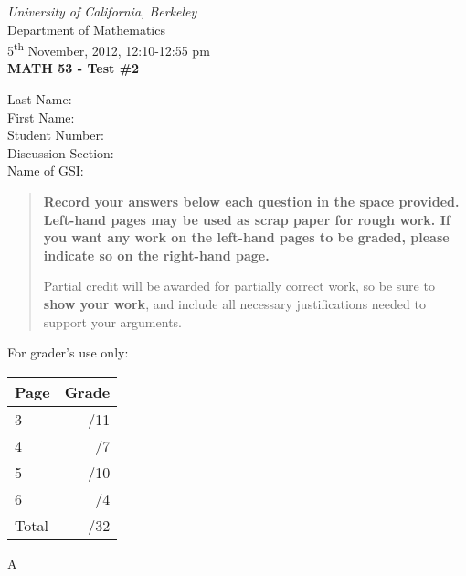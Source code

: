 \documentclass[12pt]{article}
\newcommand{\skipline}{\vspace{12pt}}
\begin{document}
\author{Instructor: Sean Fitzpatrick}
\thispagestyle{plain}
\begin{center}
\emph{University of California, Berkeley}\\
Department of Mathematics\\
5\textsuperscript{th} November, 2012, 12:10-12:55 pm\\
{\bf MATH 53 - Test \#2}\\
\end{center}
\skipline \skipline \skipline \noindent \skipline
Last Name:\underline{\hspace{350pt}}\\
\skipline
First Name:\underline{\hspace{348pt}}\\
\skipline
Student Number:\underline{\hspace{322pt}}\\
\skipline
Discussion Section: \underline{\hspace{307pt}}\\
\skipline
Name of GSI: \underline{\hspace{336pt}}\\

\vspace{0.5in}


\begin{quote}
 {\bf Record your answers below each question in the space provided.    Left-hand pages may be used as scrap paper for rough work.  If you want any work on the left-hand pages to be graded, please indicate so on the right-hand page.
 
 \bigskip
 
Partial credit will be awarded for partially correct work, so be sure to {\bf show your work}, and include all necessary justifications needed to support your arguments.}
\end{quote}


\vspace{0.5in}

For grader's use only:

\begin{table}[hbt]
\begin{center}
\begin{tabular}{|l|r|} \hline
Page&Grade\\
\hline \hline
\cline{1-2} 3 & \enspace\enspace\enspace\enspace\enspace\enspace/11\\
\cline{1-2} 4 & \enspace\enspace\enspace\enspace\enspace\enspace/7\\
\cline{1-2} 5 & \enspace\enspace\enspace\enspace\enspace\enspace/10\\
\cline{1-2} 6 & \enspace\enspace\enspace\enspace\enspace\enspace/4\\
\cline{1-2} Total & \enspace\enspace\enspace\enspace\enspace\enspace/32\\
\hline
\end{tabular}

\skipline

\skipline

\skipline

\skipline

A
\end{center}
\end{table}
\newpage
\end{document}
